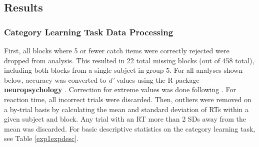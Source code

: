 \documentclass[../dissertation.tex]{subfiles}
\begin{document}
\subsection{Results}

\subsubsection{Category Learning Task Data Processing}
	First, all blocks where 5 or fewer catch items were correctly rejected were dropped from analysis. This resulted in 22 total missing blocks (out of 458 total), including both blocks from a single subject in group 5. For all analyses shown below, accuracy was converted to \textit{d'} values \citep{macmillan2004} using the R package \textbf{neuropsychology} \citep{neuropsych}. Correction for extreme values was done following \citep{Hautus1995}. For reaction time, all incorrect trials were discarded. Then, outliers were removed on a by-trial basis by calculating the mean and standard deviation of RTs within a given subject and block. Any trial with an RT more than 2 SDs away from the mean was discarded. For basic descriptive statistics on the category learning task, see Table \ref{exp1expdesc}.   \par
\end{document}
